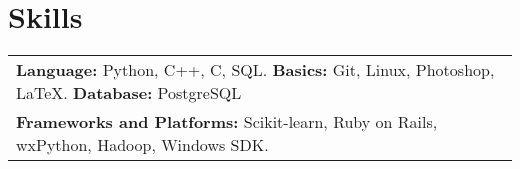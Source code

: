 \documentclass[a4paper,10pt]{article}
\begin{document}
\vspace{-0.2cm}
\section{Skills}
\vspace{-0.2cm}


\begin{tabular}{p{18cm}}
\textbf{Language:} Python, C++, C, SQL. { }{ } \textbf{Basics:} Git, Linux, Photoshop, \LaTeX. { } { } \textbf{Database:} PostgreSQL \\

\textbf{Frameworks and Platforms:} Scikit-learn, Ruby on Rails, wxPython, Hadoop, Windows SDK.  \\
\end{tabular}






\end{document}
